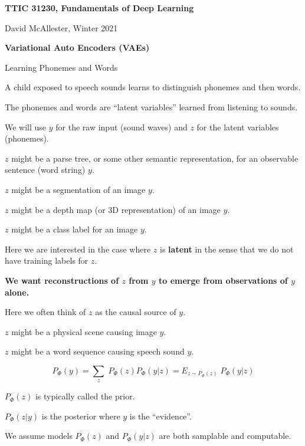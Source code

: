 




{\Huge

  \centerline{\bf TTIC 31230, Fundamentals of Deep Learning}
  \bigskip
  \centerline{David McAllester, Winter 2021}
  \vfill
  \vfill
  \centerline{\bf Variational Auto Encoders (VAEs)}
  \vfill
  \vfill

{Learning Phonemes and Words}

A child exposed to speech sounds learns to distinguish phonemes and then words.

\vfill
The phonemes and words are ``latent variables'' learned from listening to sounds.

\vfill
We will use $y$ for the raw input (sound waves) and $z$ for the latent variables (phonemes).


$z$ might be a parse tree, or some other semantic representation, for an observable sentence (word string) $y$.

\vfill
$z$ might be a segmentation of an image $y$.

\vfill
$z$ might be a depth map (or 3D representation) of an image $y$.

\vfill
$z$ might be a class label for an image $y$.

\vfill
Here we are interested in the case where $z$ is {\bf latent} in the sense that we do not have training labels for $z$.

\vfill
{\bf We want reconstructions of $z$ from $y$ to emerge from observations of $y$ alone.}


Here we often think of $z$ as the causal source of $y$.

\vfill
$z$ might be a physical scene causing image $y$.

\vfill
$z$ might be a word sequence causing speech sound $y$.


{\color{red} $$P_\Phi(y) = \sum_z\;P_\Phi(z)P_\Phi(y|z) = E_{z \sim P_\Phi(z)}\;P_\Phi(y|z)$$}

\vfill
$P_\Phi(z)$ is typically called the prior.

\vfill
$P_\Phi(z|y)$ is the posterior where $y$ is the ``evidence''.



We assume models $P_\Phi(z)$ and $P_\Phi(y|z)$ are both samplable and computable.

}
